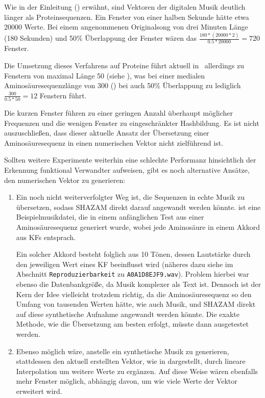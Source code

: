         Wie in der Einleitung () erwähnt, sind Vektoren der digitalen Musik deutlich länger als Proteinsequenzen. Ein Fenster von einer halben Sekunde hätte etwa 20000 Werte. Bei einem angenommenen Originalsong von drei Minuten Länge (180 Sekunden) und 50\% Überlappung der Fenster wären das $\frac{180 * (20000 * 2)}{0.5 * 20000}=720$ Fenster.

        Die Umsetzung dieses Verfahrens auf Proteine führt aktuell in \protfin\ allerdings zu Fenstern von maximal Länge 50 (siehe ), was bei einer medialen Aminosäuresequenzlänge von 300 () bei auch 50\% Überlappung zu lediglich $\frac{300}{0.5 * 50}=12$ Fenstern führt.

        Die kurzen Fenster führen zu einer geringen Anzahl überhaupt möglicher Frequenzen und die wenigen Fenster zu eingeschränkter Hashbildung. Es ist nicht auszuschließen, dass dieser aktuelle Ansatz der Übersetzung einer Aminosäuresequenz in einen numerischen Vektor nicht zielführend ist.

        Sollten weitere Experimente weiterhin eine schlechte Performanz hinsichtlich der Erkennung funktional Verwandter aufweisen, gibt es noch alternative Ansätze, den numerischen Vektor zu generieren:
        \begin{enumerate}
            \item Ein noch nicht weiterverfolgter Weg ist, die Sequenzen in echte Musik zu übersetzen, sodass SHAZAM direkt darauf angewandt werden könnte.  ist eine Beispielmusikdatei, die in einem anfänglichen Test aus einer Aminosäuresequenz generiert wurde, wobei jede Aminosäure in einem Akkord aus \acp{KF} entsprach.

            Ein solcher Akkord besteht folglich aus 10 Tönen, dessen Lautstärke durch den jeweiligen Wert eines \ac{KF} beeinflusst wird (näheres dazu siehe  im Abschnitt \texttt{Reproduzierbarkeit} zu \texttt{A0A1D8EJF9.wav}). Problem hierbei war ebenso die Datenbankgröße, da Musik komplexer als Text ist. Dennoch ist der Kern der Idee vielleicht trotzdem richtig, da die Aminosäuresequenz so den Umfang von tausenden Werten hätte, wie auch Musik, und SHAZAM direkt auf diese synthetische Aufnahme angewandt werden könnte. Die exakte Methode, wie die Übersetzung am besten erfolgt, müsste dann ausgetestet werden.

            \item Ebenso möglich wäre, anstelle ein synthetische Musik zu generieren, stattdessen den aktuell erstellten Vektor, wie in  dargestellt, durch lineare Interpolation um weitere Werte zu ergänzen. Auf diese Weise wären ebenfalls mehr Fenster möglich, abhängig davon, um wie viele Werte der Vektor erweitert wird.
        \end{enumerate}
        
